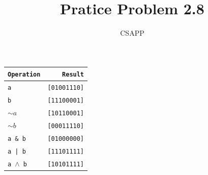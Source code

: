 \documentclass{article}
\title{Pratice Problem 2.8}
\author{CSAPP}
\begin{document}
    \maketitle

    \begin{tabular}{p{4cm} r}
        \texttt{Operation} & \texttt{Result}\\
        \midrule
        \texttt{a}              & \texttt{[01001110]}\\
        \texttt{b}              & \texttt{[11100001]}\\
        \texttt{$\sim a$}       & \texttt{[10110001]}\\
        \texttt{$\sim b$}       & \texttt{[00011110]}\\
        \texttt{a \& b}         & \texttt{[01000000]}\\
        \texttt{a | b}          & \texttt{[11101111]}\\
        \texttt{a $\land$ b}    & \texttt{[10101111]}\\
        \bottomrule
    \end{tabular}
\end{document}
